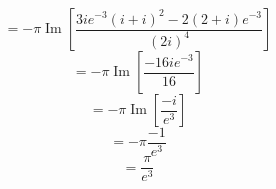 \documentclass[12pt]{article}
\renewcommand{\Im}{\operatorname{Im}}
\begin{document}
\begin{equation}
	=-\pi\Im[\frac{3ie^{-3}(i+i)^2-2(2+i)e^{-3}}{(2i)^4}]
\end{equation}
\begin{equation}
	=-\pi\Im[\frac{-16ie^{-3}}{16}]
\end{equation}
\begin{equation}
	=-\pi\Im[\frac{-i}{e^{3}}]
\end{equation}
\begin{equation}
	=-\pi\frac{-1}{e^{3}}
\end{equation}
\begin{equation}
	=\frac{\pi}{e^3}
\end{equation}
\end{document}
